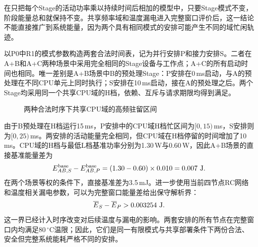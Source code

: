 在只把每个Stage的活动功率乘以持续时间后相加的模型中，只要Stage模式不变，阶段能量总和就保持不变。共享频率域和温度漏电进入完整窗口评价后，这一结论不能直接推广到系统能量，因为两个具有相同模式的安排可能产生不同的域忙闲轨迹。

以P0中R1的模式参数构造两套合法时间表，记为并行安排P和接力安排S。二者在A+B和A+C两种场景中采用完全相同的Stage设备与工作点；A+C的所有启动时间也相同。唯一差别是A+B场景中B的预处理Stage：P安排在0\,ms启动，与A的预处理在不同CPU单元上同时执行；S安排在10\,ms启动，接在A的预处理之后。两个Stage均采用同一个共享CPU域的H档，依赖、互斥与请求期限均得到满足。


\begin{figure}[htbp]
 \centering
 \caption{两种合法时序下共享CPU域的高频驻留区间}
 \label{fig:c3-timing}
\end{figure}


由于B预处理在H档运行15\,ms，P安排中的CPU域H档忙区间为$[0,15)$\,ms，S安排则为$[0,25)$\,ms。两安排的活动能量完全相同，但CPU域在H档停留的时间增加了10\,ms。CPU域的H档与最低L档基准功率分别为1.30\,W与0.60\,W，因此A+B场景的直接基准能量差为
\begin{equation}
 E^{\rm base}_{AB,S}-E^{\rm base}_{AB,P}
  =(1.30-0.60)\times0.010
  =0.007\ {\rm J}.
 \label{eq:c3-c19-base}
\end{equation}
在两个场景等权的条件下，直接基准差为3.5\,mJ。进一步使用当前四节点RC网络和温度相关漏电参数，可以为完整窗口能量差给出保守解析界：
\begin{equation}
 \overline E_S-\overline E_P>0.003254\ {\rm J}.
 \label{eq:c3-c19-total}
\end{equation}
这一界已经计入时序改变对后续温度与漏电的影响。两套安排的所有节点在完整窗口内均满足80\,$^\circ$C温限；因此，它们是同一有限模式与共享部署条件下两份合法、安全但完整系统能耗严格不同的安排。

